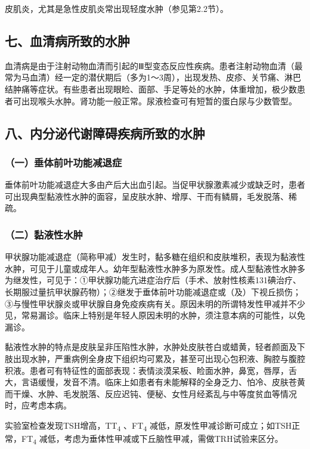 皮肌炎，尤其是急性皮肌炎常出现轻度水肿（参见第2.2节）。

\subsection{七、血清病所致的水肿}

血清病是由于注射动物血清而引起的Ⅲ型变态反应性疾病。患者注射动物血清（最常为马血清）经一定的潜伏期后（多为1～3周），出现发热、皮疹、关节痛、淋巴结肿痛等症状。有些患者出现眼睑、面部、手足等处的水肿，体重增加，极少数患者可出现喉头水肿。肾功能一般正常。尿液检查可有短暂的蛋白尿与少数管型。

\subsection{八、内分泌代谢障碍疾病所致的水肿}

\subsubsection{（一）垂体前叶功能减退症}

垂体前叶功能减退症大多由产后大出血引起。当促甲状腺激素减少或缺乏时，患者可出现典型黏液性水肿的面容，呈皮肤水肿、增厚、干而有鳞屑，毛发脱落、稀疏。

\subsubsection{（二）黏液性水肿}

甲状腺功能减退症（简称甲减）发生时，黏多糖在组织和皮肤堆积，表现为黏液性水肿，可见于儿童或成年人。幼年型黏液性水肿多为原发性。成人型黏液性水肿多为继发性，可见于：①甲状腺功能亢进症治疗后（手术、放射性核素131碘治疗、长期服过量抗甲状腺药物）；②继发于垂体前叶功能减退症或（及）下视丘损伤；③与慢性甲状腺炎或甲状腺自身免疫疾病有关。原因未明的所谓特发性甲减并不少见，常易漏诊。临床上特别是年轻人原因未明的水肿，须注意本病的可能性，以免漏诊。

黏液性水肿的特点是皮肤呈非压陷性水肿，水肿处皮肤苍白或蜡黄，轻者颜面及下肢出现水肿，严重病例全身皮下组织均可累及，甚至可出现心包积液、胸腔与腹腔积液。患者可有特征性的面部表现：表情淡漠呆板、睑面水肿，鼻宽，唇厚，舌大，言语缓慢，发音不清。临床上如患者有未能解释的全身乏力、怕冷、皮肤苍黄而干燥、水肿、毛发脱落、反应迟钝、便秘、女性月经紊乱与中等度贫血等情况时，应考虑本病。

实验室检查发现TSH增高，TT\textsubscript{4} 、FT\textsubscript{4}
减低，原发性甲减诊断可成立；如TSH正常，FT\textsubscript{4}
减低，考虑为垂体性甲减或下丘脑性甲减，需做TRH试验来区分。

